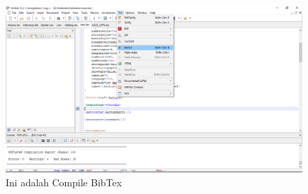 \begin{enumerate}
   \begin{figure}[!htbp]
  \centering
  \includegraphics[width=.75\textwidth]{figures/bibtexx.png}
  \caption{Ini adalah Compile BibTex}\label{fig:bibtexx}
\end{figure}
\end{enumerate}
